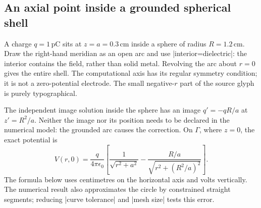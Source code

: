 \subsection{An axial point inside a grounded spherical shell}
A charge $q=1\,\mathrm{pC}$ sits at $z=a=0.3\,\mathrm{cm}$ inside a sphere of
radius $R=1.2\,\mathrm{cm}$. Draw the right-hand meridian as an open arc and
use |interior=dielectric|: the interior contains the field, rather than solid
metal. Revolving the arc about $r=0$ gives the entire shell. The computational
axis has its regular symmetry condition; it is not a zero-potential electrode.
The small negative-$r$ part of the source glyph is purely typographical.

\Needspace{16cm}
\begin{codeexample}[width=0pt]
\end{codeexample}

The independent image solution inside the sphere has an image $q'=-qR/a$
at $z'=R^2/a$. Neither the image nor its position needs to be declared in the
numerical model: the grounded arc causes the correction. On $\Gamma$, where
$z=0$, the exact potential is
\[
 V(r,0)=\frac{q}{4\pi\epsilon_0}
 \left[\frac{1}{\sqrt{r^2+a^2}}-
       \frac{R/a}{\sqrt{r^2+(R^2/a)^2}}\right].
\]
The formula below uses centimetres on the horizontal axis and volts vertically.
The numerical result also approximates the circle by constrained straight
segments; reducing |curve tolerance| and |mesh size| tests this error.

